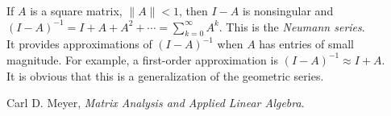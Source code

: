 \documentclass[12pt]{article}
\begin{document}
If $A$ is a square matrix, $\|A\|<1$, then $I-A$ is nonsingular and 
$(I-A)^{-1}=I+A+A^2+\cdots=\sum_{k=0}^{\infty}A^k$. This is the \emph{Neumann series}. 
\\It provides approximations of $(I-A)^{-1}$ 
when $A$ has entries of small magnitude.
For example, a first-order approximation is $(I-A)^{-1}\approx I+A$.
\\It is obvious that this is a generalization of the geometric series.
\begin{thebibliography}{6}
Carl D. Meyer, {\it Matrix Analysis and Applied Linear Algebra}.
\end{thebibliography}
\end{document}
